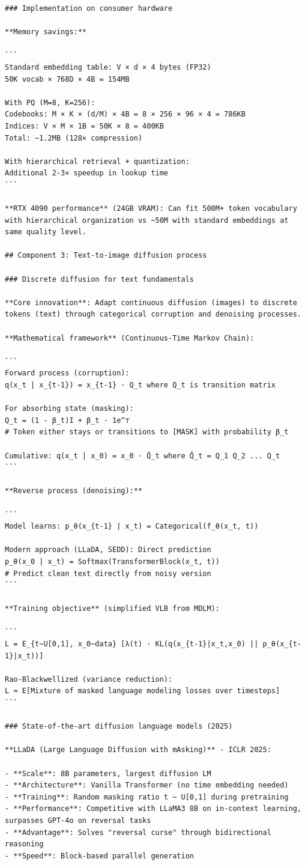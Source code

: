 \documentclass[11pt]{article}
\begin{document}
\begin{verbatim}
### Implementation on consumer hardware

**Memory savings:**

```
Standard embedding table: V × d × 4 bytes (FP32)
50K vocab × 768D × 4B = 154MB

With PQ (M=8, K=256):
Codebooks: M × K × (d/M) × 4B = 8 × 256 × 96 × 4 = 786KB
Indices: V × M × 1B = 50K × 8 = 400KB
Total: ~1.2MB (128× compression)

With hierarchical retrieval + quantization:
Additional 2-3× speedup in lookup time
```

**RTX 4090 performance** (24GB VRAM): Can fit 500M+ token vocabulary with hierarchical organization vs ~50M with standard embeddings at same quality level.

## Component 3: Text-to-image diffusion process

### Discrete diffusion for text fundamentals

**Core innovation**: Adapt continuous diffusion (images) to discrete tokens (text) through categorical corruption and denoising processes.

**Mathematical framework** (Continuous-Time Markov Chain):

```
Forward process (corruption):
q(x_t | x_{t-1}) = x_{t-1} · Q_t where Q_t is transition matrix

For absorbing state (masking):
Q_t = (1 - β_t)I + β_t · 1e^⊤
# Token either stays or transitions to [MASK] with probability β_t

Cumulative: q(x_t | x_0) = x_0 · Q̄_t where Q̄_t = Q_1 Q_2 ... Q_t
```

**Reverse process (denoising):**

```
Model learns: p_θ(x_{t-1} | x_t) = Categorical(f_θ(x_t, t))

Modern approach (LLaDA, SEDD): Direct prediction
p_θ(x_0 | x_t) = Softmax(TransformerBlock(x_t, t))
# Predict clean text directly from noisy version
```

**Training objective** (simplified VLB from MDLM):

```
L = E_{t~U[0,1], x_0~data} [λ(t) · KL(q(x_{t-1}|x_t,x_0) || p_θ(x_{t-1}|x_t))]

Rao-Blackwellized (variance reduction):
L ≈ E[Mixture of masked language modeling losses over timesteps]
```

### State-of-the-art diffusion language models (2025)

**LLaDA (Large Language Diffusion with mAsking)** - ICLR 2025:

- **Scale**: 8B parameters, largest diffusion LM
- **Architecture**: Vanilla Transformer (no time embedding needed)
- **Training**: Random masking ratio t ~ U[0,1] during pretraining
- **Performance**: Competitive with LLaMA3 8B on in-context learning, surpasses GPT-4o on reversal tasks
- **Advantage**: Solves "reversal curse" through bidirectional reasoning
- **Speed**: Block-based parallel generation


\end{verbatim}
\end{document}
